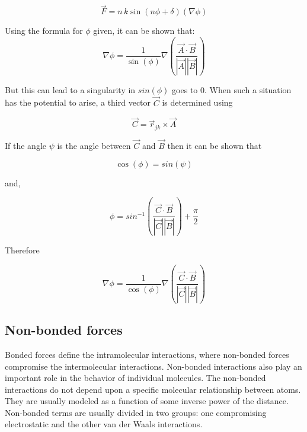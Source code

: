 \documentclass[11pt]{report}
\newcommand{\Vr}[1]{\mbox{$\vec{r}_{#1}$}}
\begin{document}
\begin{appendix}
\begin{equation}
  \vec{F} = n\,k \sin(n \phi + \delta) \left( \nabla \phi \right)
\end{equation}

\noindent
Using the formula for $\phi$ given, it can be shown that:\\

\begin{equation}
  \nabla \phi =  \frac{ 1 }{ \sin(\phi) } \nabla \left( \frac{ \vec{A}
\cdot \vec{B} }{ |\vec{A}| |\vec{B}| } \right) 
\end{equation}

\noindent
But this can lead to a singularity in $sin( \phi )$ goes to 0.  When
 such a situation has the potential to arise, a third vector $\vec{C}$ 
is determined using

\begin{equation}
        \vec{C} = \Vr{jk} \times \vec{A}
\end{equation}

\noindent
If the angle $\psi$ is the angle between $\vec{C}$ and $\vec{B}$ then 
it can be shown that

\begin{equation}
        \cos( \phi ) = sin ( \psi )
\end{equation}

\noindent
and,

\begin{equation}
        \phi =  sin^{-1} \left( \frac{ \vec{C} \cdot \vec{B} }{ |\vec{C}| |\vec{B}| } \right) + \frac{ \pi }{ 2 }
\end{equation}

\noindent
Therefore

\begin{equation}
  \nabla \phi =  \frac{ 1 }{ \cos(\phi) } \nabla \left( \frac{ \vec{C}
\cdot \vec{B} }{ |\vec{C}| |\vec{B}| } \right) 
\end{equation}




\subsection{Non-bonded forces}
Bonded forces define the intramolecular interactions, where non-bonded
forces compromise the intermolecular interactions. Non-bonded
interactions also play an important role in the behavior of individual molecules.
The non-bonded interactions do not depend upon a specific molecular
relationship between atoms. They are usually modeled as a function of
some inverse power of the distance. Non-bonded terms are usually
divided in two groups: one compromising electrostatic and the other
van der Waals interactions. \\


\end{appendix}
\end{document}
